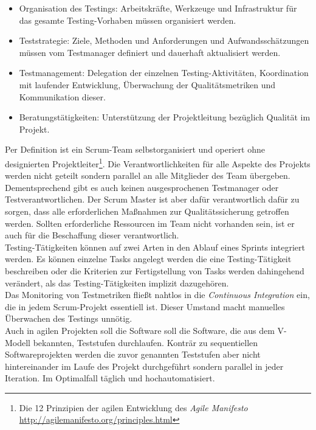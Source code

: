 \begin{itemize}
\item Organisation des Testings: Arbeitskräfte, Werkzeuge und Infrastruktur für das gesamte Testing-Vorhaben müssen organisiert werden.
\item Teststrategie: Ziele, Methoden und Anforderungen und Aufwandsschätzungen müssen vom Testmanager definiert und dauerhaft aktualisiert werden.
\item Testmanagement: Delegation der einzelnen Testing-Aktivitäten, Koordination mit laufender Entwicklung, Überwachung der Qualitätsmetriken und Kommunikation dieser.
\item Beratungstätigkeiten: Unterstützung der Projektleitung bezüglich Qualität im Projekt.
\end{itemize}

Per Definition ist ein Scrum-Team selbstorganisiert und operiert ohne designierten Projektleiter\footnote{Die 12 Prinzipien der agilen Entwicklung des \textit{Agile Manifesto} \url{http://agilemanifesto.org/principles.html}}. Die Verantwortlichkeiten für alle Aspekte des Projekts werden nicht geteilt sondern parallel an alle Mitglieder des Team übergeben. Dementsprechend gibt es auch keinen ausgesprochenen Testmanager oder Testverantwortlichen. Der Scrum Master ist aber dafür verantwortlich dafür zu sorgen, dass alle erforderlichen Maßnahmen zur Qualitätssicherung getroffen werden. Sollten erforderliche Ressourcen im Team nicht vorhanden sein, ist er auch für die Beschaffung dieser verantwortlich\cite{linz_testing_2014}.\\
Testing-Tätigkeiten können auf zwei Arten in den Ablauf eines Sprints integriert werden. Es können einzelne Tasks angelegt werden die eine Testing-Tätigkeit beschreiben oder die Kriterien zur Fertigstellung von Tasks werden dahingehend verändert, als das Testing-Tätigkeiten implizit dazugehören.\\
Das Monitoring von Testmetriken fließt nahtlos in die \textit{Continuous Integration} ein, die in jedem Scrum-Projekt essentiell ist. Dieser Umstand macht manuelles Überwachen des Testings unnötig\cite{linz_testing_2014}.\\
Auch in agilen Projekten soll die Software soll die Software, die aus dem V-Modell bekannten, Teststufen durchlaufen. Konträr zu sequentiellen Softwareprojekten werden die zuvor genannten Teststufen aber nicht hintereinander im Laufe des Projekt durchgeführt sondern parallel in jeder Iteration. Im Optimalfall täglich und hochautomatisiert\cite{linz_testing_2014}.

